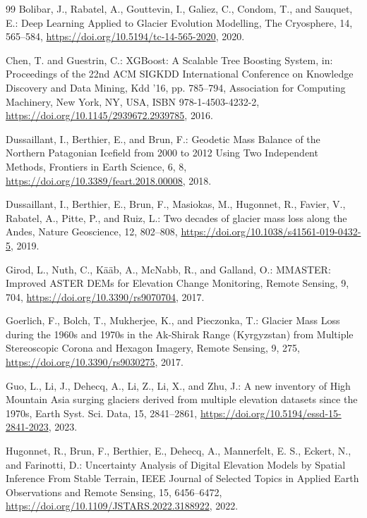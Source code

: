 \begin{thebibliography}{99}
 Bolibar, J., Rabatel, A., Gouttevin, I., Galiez, C., Condom, T., and Sauquet, E.: Deep Learning Applied to Glacier Evolution Modelling, The Cryosphere, 14, 565–584, \url{https://doi.org/10.5194/tc-14-565-2020}, 2020.

 Chen, T. and Guestrin, C.: XGBoost: A Scalable Tree Boosting System, in: Proceedings of the 22nd ACM SIGKDD International Conference on Knowledge Discovery and Data Mining, Kdd ’16, pp. 785–794, Association for Computing Machinery, New York, NY, USA, ISBN 978-1-4503-4232-2, \url{https://doi.org/10.1145/2939672.2939785}, 2016.

 Dussaillant, I., Berthier, E., and Brun, F.: Geodetic Mass Balance of the Northern Patagonian Icefield from 2000 to 2012 Using Two Independent Methods, Frontiers in Earth Science, 6, 8, \url{https://doi.org/10.3389/feart.2018.00008}, 2018.

 Dussaillant, I., Berthier, E., Brun, F., Masiokas, M., Hugonnet, R., Favier, V., Rabatel, A., Pitte, P., and Ruiz, L.: Two decades of glacier mass loss along the Andes, Nature Geoscience, 12, 802–808, \url{https://doi.org/10.1038/s41561-019-0432-5}, 2019.

 Girod, L., Nuth, C., Kääb, A., McNabb, R., and Galland, O.: MMASTER: Improved ASTER DEMs for Elevation Change Monitoring, Remote Sensing, 9, 704, \url{https://doi.org/10.3390/rs9070704}, 2017.

 Goerlich, F., Bolch, T., Mukherjee, K., and Pieczonka, T.: Glacier Mass Loss during the 1960s and 1970s in the Ak-Shirak Range (Kyrgyzstan) from Multiple Stereoscopic Corona and Hexagon Imagery, Remote Sensing, 9, 275, \url{https://doi.org/10.3390/rs9030275}, 2017.

 Guo, L., Li, J., Dehecq, A., Li, Z., Li, X., and Zhu, J.: A new inventory of High Mountain Asia surging glaciers derived from multiple elevation datasets since the 1970s, Earth Syst. Sci. Data, 15, 2841--2861, \url{https://doi.org/10.5194/essd-15-2841-2023}, 2023.

 Hugonnet, R., Brun, F., Berthier, E., Dehecq, A., Mannerfelt, E. S., Eckert, N., and Farinotti, D.: Uncertainty Analysis of Digital Elevation Models by Spatial Inference From Stable Terrain, IEEE Journal of Selected Topics in Applied Earth Observations and Remote Sensing, 15, 6456–6472, \url{https://doi.org/10.1109/JSTARS.2022.3188922}, 2022.


\end{thebibliography}
